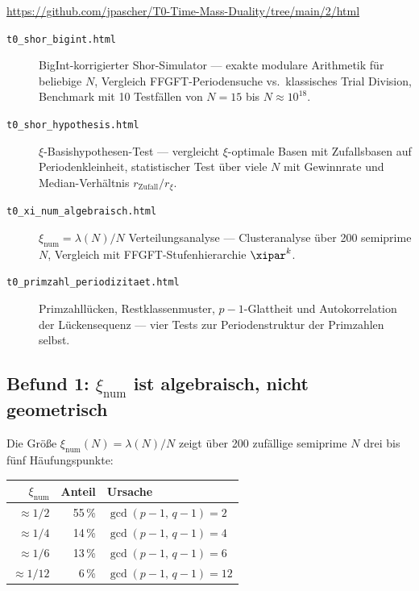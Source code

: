\begin{center}
\url{https://github.com/jpascher/T0-Time-Mass-Duality/tree/main/2/html}
\end{center}

\begin{description}
  \item[\texttt{t0\_shor\_bigint.html}]
    BigInt-korrigierter Shor-Simulator ---
    exakte modulare Arithmetik für beliebige $N$,
    Vergleich FFGFT-Periodensuche vs.\ klassisches Trial Division,
    Benchmark mit 10 Testfällen von $N=15$ bis $N \approx 10^{18}$.

  \item[\texttt{t0\_shor\_hypothesis.html}]
    $\xi$-Basishypothesen-Test ---
    vergleicht $\xi$-optimale Basen mit Zufallsbasen
    auf Periodenkleinheit, statistischer Test über viele $N$
    mit Gewinnrate und Median-Verhältnis $r_\text{Zufall}/r_\xi$.

  \item[\texttt{t0\_xi\_num\_algebraisch.html}]
    $\xi_\text{num} = \lambda(N)/N$ Verteilungsanalyse ---
    Clusteranalyse über 200 semiprime $N$,
    Vergleich mit FFGFT-Stufenhierarchie $\xipar^k$.

  \item[\texttt{t0\_primzahl\_periodizitaet.html}]
    Primzahllücken, Restklassenmuster, $p{-}1$-Glattheit
    und Autokorrelation der Lückensequenz ---
    vier Tests zur Periodenstruktur der Primzahlen selbst.
\end{description}

\subsection{Befund 1: \texorpdfstring{$\xi_\text{num}$}{xi_num} ist algebraisch,
  nicht geometrisch}

Die Größe $\xi_\text{num}(N) = \lambda(N)/N$
zeigt über 200 zufällige semiprime $N$
drei bis fünf Häufungspunkte:

\begin{center}
\begin{tabular}{rrl}
\toprule
$\xi_\text{num}$ & Anteil & Ursache \\
\midrule
$\approx 1/2$ & 55\,\% & $\gcd(p-1,\,q-1) = 2$ \\
$\approx 1/4$ & 14\,\% & $\gcd(p-1,\,q-1) = 4$ \\
$\approx 1/6$ & 13\,\% & $\gcd(p-1,\,q-1) = 6$ \\
$\approx 1/12$ & 6\,\% & $\gcd(p-1,\,q-1) = 12$ \\
\bottomrule
\end{tabular}
\end{center}


